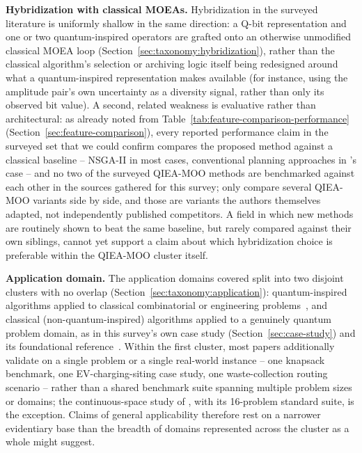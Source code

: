 \textbf{Hybridization with classical MOEAs.} Hybridization in the
surveyed literature is uniformly shallow in the same direction: a Q-bit
representation and one or two quantum-inspired operators are grafted
onto an otherwise unmodified classical MOEA loop
(Section~\ref{sec:taxonomy:hybridization}), rather than the classical
algorithm's selection or archiving logic itself being redesigned around
what a quantum-inspired representation makes available (for instance,
using the amplitude pair's own uncertainty as a diversity signal, rather
than only its observed bit value). A second, related weakness is
evaluative rather than architectural: as already noted from
Table~\ref{tab:feature-comparison-performance}
(Section~\ref{sec:feature-comparison}), every reported performance claim
in the surveyed set that we could confirm compares the proposed method
against a classical baseline -- NSGA-II in most cases, conventional
planning approaches in \citet{kumar2026eahqnsga2}'s case -- and no two of the surveyed QIEA-MOO methods are
benchmarked against each other in the sources gathered for this
survey; only \citet{olvera2023continuous} compare several QIEA-MOO
variants side by side, and those are variants the authors themselves
adapted, not independently published competitors. A field in which new
methods are routinely shown to beat the same baseline, but rarely
compared against their own siblings, cannot yet support a claim about
which hybridization choice is preferable within the QIEA-MOO cluster
itself.

\textbf{Application domain.} The application domains covered split into
two disjoint clusters with no overlap
(Section~\ref{sec:taxonomy:application}): quantum-inspired algorithms
applied to classical combinatorial or engineering
problems~\citep{kim2006qmea,kumar2026eahqnsga2,gilea2026waste}, and
classical (non-quantum-inspired) algorithms applied to a genuinely
quantum problem domain, as in this survey's own case study
(Section~\ref{sec:case-study}) and its foundational
reference~\citep{ghlib2026scalable}. Within the first cluster, most
papers additionally validate on a single problem or a single real-world
instance -- one knapsack benchmark, one EV-charging-siting case study,
one waste-collection routing scenario -- rather than a shared benchmark
suite spanning multiple problem sizes or domains; the continuous-space
study of \citet{olvera2023continuous}, with its 16-problem standard
suite, is the exception. Claims of general applicability therefore rest
on a narrower evidentiary base than the breadth of domains represented
across the cluster as a whole might suggest.

